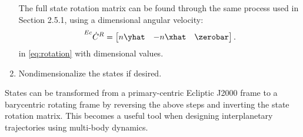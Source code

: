 \begin{enumerate}
            The full state rotation matrix can be found through the same process used in Section
            2.5.1, using a dimensional angular velocity:
            \begin{equation}
                \prescript{Ec}{}{\dot{C}}^{R}=\begin{bmatrix}   n\yhat  &   -n\xhat &   \zerobar    \end{bmatrix}.
                \label{eq:eclipticvelocityrotation}
            \end{equation}
            in \cref{eq:rotation} with dimensional values.
    \item   Nondimensionalize the states if desired.
\end{enumerate}

States can be transformed from a primary-centric Ecliptic J2000 frame to a barycentric rotating
frame by reversing the above steps and inverting the state rotation matrix. This becomes a useful
tool when designing interplanetary trajectories using multi-body dynamics.
